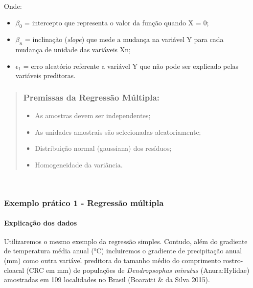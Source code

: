 \documentclass[
]{book}
\providecommand{\tightlist}{%
  \setlength{\itemsep}{0pt}\setlength{\parskip}{0pt}}
\begin{document}
Onde:

\begin{itemize}
\item
  \(\beta_0\) = intercepto que representa o valor da função quando X = 0;
\item
  \(\beta_{n}\) = inclinação (\emph{slope}) que mede a mudança na variável Y para cada mudança de unidade das variáveis Xn;
\item
  \(\epsilon_{1}\) = erro aleatório referente a variável Y que não pode ser explicado pelas variáveis preditoras.
\end{itemize}

\begin{quote}
\hypertarget{premissas-da-regressuxe3o-muxfaltipla}{%
\subsubsection{Premissas da Regressão Múltipla:}\label{premissas-da-regressuxe3o-muxfaltipla}}

\begin{itemize}
\tightlist
\item
  As amostras devem ser independentes;
\item
  As unidades amostrais são selecionadas aleatoriamente;
\item
  Distribuição normal (gaussiana) dos resíduos;
\item
  Homogeneidade da variância.
\end{itemize}
\end{quote}

~

\hypertarget{exemplo-pruxe1tico-1---regressuxe3o-muxfaltipla}{%
\subsubsection{Exemplo prático 1 - Regressão múltipla}\label{exemplo-pruxe1tico-1---regressuxe3o-muxfaltipla}}

\hypertarget{explicauxe7uxe3o-dos-dados-5}{%
\paragraph{Explicação dos dados}\label{explicauxe7uxe3o-dos-dados-5}}

Utilizaremos o mesmo exemplo da regressão simples. Contudo, além do gradiente de temperatura média anual (°C) incluiremos o gradiente de precipitação anual (mm) como outra variável preditora do tamanho médio do comprimento rostro-cloacal (CRC em mm) de populações de \emph{Dendropsophus minutus} (Anura:Hylidae) amostradas em 109 localidades no Brasil (Boaratti \& da Silva 2015).
\end{document}
